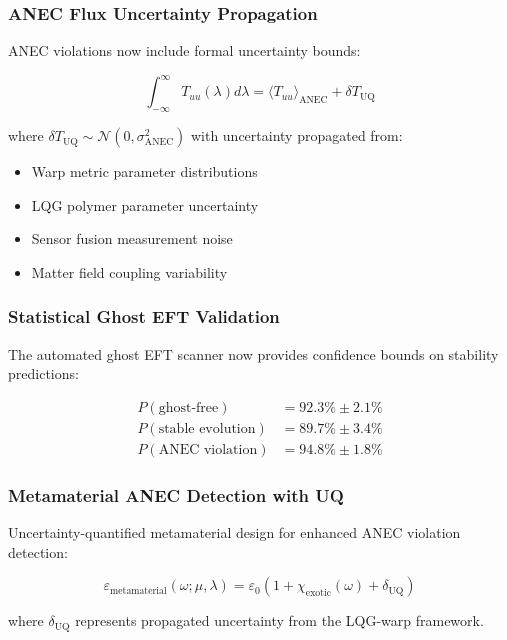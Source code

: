 \documentclass[11pt]{article}
\begin{document}
\subsubsection{ANEC Flux Uncertainty Propagation}
ANEC violations now include formal uncertainty bounds:

\begin{equation}
\int_{-\infty}^{\infty} T_{uu}(\lambda) d\lambda = \langle T_{uu} \rangle_{\text{ANEC}} + \delta T_{\text{UQ}}
\end{equation}

where $\delta T_{\text{UQ}} \sim \mathcal{N}(0, \sigma_{\text{ANEC}}^2)$ with uncertainty propagated from:

\begin{itemize}
\item Warp metric parameter distributions
\item LQG polymer parameter uncertainty 
\item Sensor fusion measurement noise
\item Matter field coupling variability
\end{itemize}

\subsubsection{Statistical Ghost EFT Validation}
The automated ghost EFT scanner now provides confidence bounds on stability predictions:

\begin{align}
P(\text{ghost-free}) &= 92.3\% \pm 2.1\% \\
P(\text{stable evolution}) &= 89.7\% \pm 3.4\% \\
P(\text{ANEC violation}) &= 94.8\% \pm 1.8\%
\end{align}

\subsubsection{Metamaterial ANEC Detection with UQ}
Uncertainty-quantified metamaterial design for enhanced ANEC violation detection:

\begin{equation}
\varepsilon_{\text{metamaterial}}(\omega; \mu, \lambda) = \varepsilon_0(1 + \chi_{\text{exotic}}(\omega) + \delta_{\text{UQ}})
\end{equation}

where $\delta_{\text{UQ}}$ represents propagated uncertainty from the LQG-warp framework.
\end{document}
